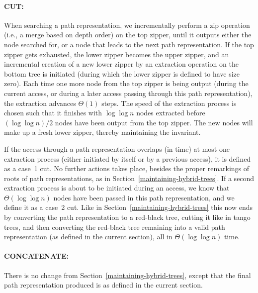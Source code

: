 \documentclass[letterpaper,11pt]{article}
\newcommand{\bottomtree}{bottom tree}
\begin{document}
\paragraph{CUT:}
When searching a path representation, we incrementally perform a zip
operation (i.e., a merge based on depth order) on the top zipper, until
it outputs either the node searched for, or a node that leads to the next
path representation. If the top zipper gets exhausted, the lower zipper
becomes the upper zipper, and an incremental creation of a new lower zipper
by an extraction operation on the \bottomtree{} is initiated (during which
the lower zipper is defined to have size zero). Each time one more node
from the top zipper is being output (during the current access, or during a
later access passing through this path representation), the extraction
advances $\Theta(1)$ steps. The speed of the extraction process is chosen
such that it finishes with $\log\log n$ nodes extracted before $(\log\log
n)/2$ nodes have been output from the top zipper. The new nodes will make
up a fresh lower zipper, thereby maintaining the invariant.

If the access through a path representation overlaps (in time) at most one
extraction process (either initiated by itself or by a previous access), it
is defined as a case~1 cut. No further actions takes place, besides the
proper remarkings of roots of path representations, as in
Section~\ref{maintaining-hybrid-trees}. If a second extraction process is
about to be initiated during an access, we know that $\Theta(\log\log n)$
nodes have been passed in this path representation, and we define it as a
case~2 cut. Like in Section~\ref{maintaining-hybrid-trees} this now ends by
converting the path representation to a red-black tree, cutting it like in
tango trees, and then converting the red-black tree remaining into a valid
path representation (as defined in the current section), all in
$\Theta(\log\log n)$ time.

\paragraph{CONCATENATE:} There is no change from
Section~\ref{maintaining-hybrid-trees}, except that the final path
representation produced is as defined in the current section.
\end{document}
